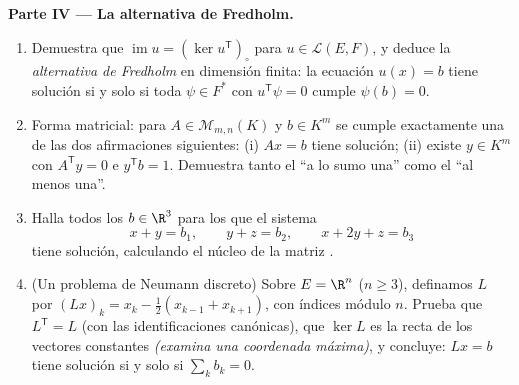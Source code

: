 \begin{problem}
\medskip
\noindent\textbf{Parte IV --- La alternativa de Fredholm.}
\begin{enumerate}[resume]
  \item Demuestra que $\operatorname{im} u = (\ker u^{\mathsf
        T})_\circ$ para $u \in \mathcal{L}(E, F)$, y deduce la
        \emph{alternativa de Fredholm} en dimensión finita: la
        ecuación $u(x) = b$ tiene solución si y solo si toda $\psi
        \in F^*$ con $u^{\mathsf T}\psi = 0$ cumple $\psi(b) = 0$.
  \item Forma matricial: para $A \in \mathcal{M}_{m,n}(K)$ y $b \in
        K^m$ se cumple exactamente una de las dos afirmaciones
        siguientes: (i) $Ax = b$ tiene solución; (ii) existe $y \in
        K^m$ con $A^{\mathsf T}y = 0$ e $y^{\mathsf T}b = 1$.
        Demuestra tanto el ``a lo sumo una'' como el ``al menos
        una''.
  \item Halla todos los $b \in \R^3$ para los que el sistema
        \[
        x + y = b_1, \qquad y + z = b_2, \qquad x + 2y + z = b_3
        \]
        tiene solución, calculando el núcleo de la matriz
        .
  \item (Un problema de Neumann discreto) Sobre $E = \R^n$ ($n \geq
        3$), definamos $L$ por $(Lx)_k = x_k - \frac12(x_{k-1} +
        x_{k+1})$, con índices módulo $n$. Prueba que $L^{\mathsf T}
        = L$ (con las identificaciones canónicas), que $\ker L$ es
        la recta de los vectores constantes \emph{(examina una
        coordenada máxima)}, y concluye: $Lx = b$ tiene solución si
        y solo si $\sum_k b_k = 0$.
\end{enumerate}


\end{problem}
